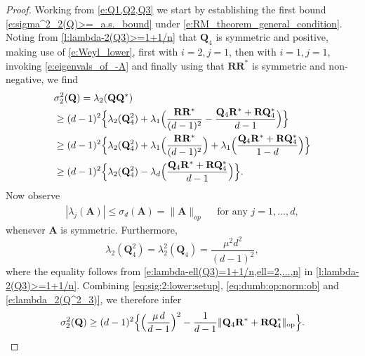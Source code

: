 \documentclass[9pt,twocolumn,twoside]{pnas-new}
\newcommand{\?}{\textbf{?}}
\newcommand{\op}{\textnormal{op}}
\newcommand{\QQ}{\mathbf{Q}}
\newcommand{\AAA}{\mathbf{A}}
\newcommand{\RM}{\mathbf{R}}
\begin{document}
\begin{proof}
Working from \eqref{e:Q1,Q2,Q3} we start by establishing the first
bound \eqref{e:sigma^2_2(Q)>=_a.s._bound} under
\eqref{e:RM_theorem_general_condition}. Noting from
\cref{l:lambda-2(Q3)>=1+1/n} that $\QQ_4$ is symmetric and positive,
making use of \eqref{e:Weyl_lower}, first with $i =2, j =1$, then with
$i=1, j =1$, invoking \eqref{e:eigenvals_of_-A} and finally using that
$\RM\RM^*$ is symmetric and non-negative, we find
\begin{align}
  &\sigma^2_2(\QQ) = \lambda_2(\QQ\QQ^*)
  \notag\\
 &\geq (d-1)^2 \Big\{ \lambda_{2}(\QQ^2_4) + \lambda_{1}\Big(\frac{\RM\RM^*}{(d-1)^2}
   - \frac{\QQ_4\RM^*+ \RM\QQ^*_4}{d-1} \Big) \Big\}
  \notag\\
 &\geq (d-1)^2 \Big\{ \lambda_{2}(\QQ^2_4) + \lambda_{1}\Big(\frac{\RM\RM^*}{(d-1)^2}\Big)
   +\lambda_{1} \Big(\frac{\QQ_4\RM^*+ \RM\QQ^*_4}{1-d} \Big) \Big\}
  \notag\\
 &\geq (d-1)^2 \Big\{ \lambda_{2}(\QQ^2_4) 
   -\lambda_{d} \Big(\frac{\QQ_4\RM^*+ \RM\QQ^*_4}{d-1} \Big) \Big\}.
   \label{eq:sig:2:lower:setup}
\end{align}
Now observe
\begin{align}
  |\lambda_j(\AAA)| \leq \sigma_d(\AAA) = \| \AAA\|_{op} \quad
  \text{ for
  any $j =1,\ldots, d$},
  \label{eq:dumb:op:norm:ob}
\end{align}
whenever $\AAA$ is symmetric.
Furthermore,
\begin{equation}\label{e:lambda_2(Q^2_3)}
\lambda_{2}(\QQ^2_4) = \lambda^2_{2}(\QQ_4) = \frac{\mu^2d^2}{(d-1)^2},
\end{equation}
where the equality follows from
\eqref{e:lambda-ell(Q3)=1+1/n,ell=2,...,n} in
\cref{l:lambda-2(Q3)>=1+1/n}.  Combining \eqref{eq:sig:2:lower:setup},
\eqref{eq:dumb:op:norm:ob} and \eqref{e:lambda_2(Q^2_3)}, we therefore
infer
\begin{equation}\label{e:sigma^2_2(Q)>=_bound}
  \sigma^2_2(\QQ) \geq (d-1)^2
  \Big\{ \Big( \frac{\mu \hspace{0.5mm} d}{d-1}\Big)^2 
- \frac{1}{d-1} \|\QQ_4\RM^*+ \RM\QQ^*_4\|_{\op}\Big\}.
\end{equation}


\end{proof}
\end{document}

